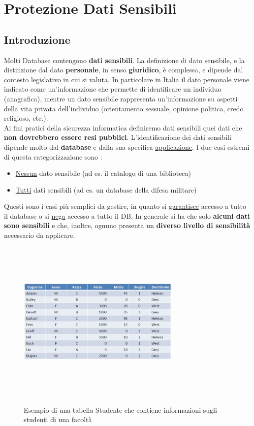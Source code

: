 \chapter{Protezione Dati Sensibili}

\section{Introduzione}
Molti Database contengono \textbf{dati sensibili}. La definizione di dato sensibile, e la distinzione dal dato \textbf{personale}, in senso \textbf{giuridico}, è complessa, e dipende dal contesto legislativo in cui si valuta. In particolare in Italia il dato personale viene indicato come un'informazione che permette di identificare un individuo (anagrafica), mentre un dato sensibile rappresenta un'informazione su aspetti della vita privata dell'individuo (orientamento sessuale, opinione politica, credo religioso, etc.). \\

Ai fini pratici della sicurezza informatica definiremo dati sensibili quei dati che \textbf{non dovrebbero essere resi pubblici}. L'identificazione dei dati sensibili dipende molto dal \textbf{database} e dalla sua specifica \underline{applicazione}. I due casi estremi di questa categorizzazione sono : 
\begin{itemize}
\item \underline{Nessun} dato sensibile (ad es. il catalogo di una biblioteca)
\item \underline{Tutti} dati sensibili (ad es. un database della difesa militare)
\end{itemize}
Questi sono i casi più semplici da gestire, in quanto si \underline{garantisce} accesso a tutto il database o si \underline{nega} accesso a tutto il DB. In generale si ha che solo \textbf{alcuni dati sono sensibili} e che, inoltre, ognuno presenta un \textbf{diverso livello di sensibilità} necessario da applicare.

\begin{figure}[htbp]
	\centering
	{\includegraphics[height=8cm, width=8cm, keepaspectratio]{Immagini/dati_sensibili/prot_dati_01.JPG}}
	\caption{Esempio di una tabella Studente che contiene informazioni sugli studenti di una facoltà\label{fig:tabella_db}}
\end{figure}

